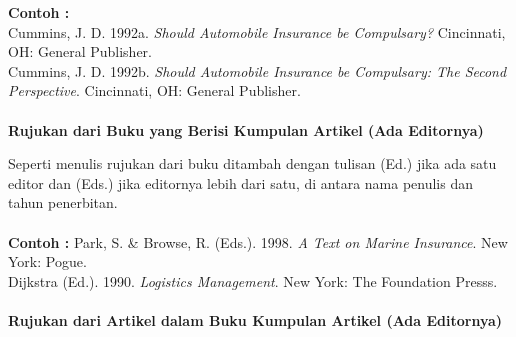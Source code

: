 \textbf{Contoh :} \\
Cummins,	J.	D.	1992a. \textit{Should	Automobile	Insurance	be	Compulsary?}	Cincinnati,	OH:	General	Publisher. \\
Cummins,	 J.	 D.	 1992b.	\textit{Should	 Automobile	 Insurance	 be	 Compulsary:	 The	 Second	Perspective}. Cincinnati,	OH:	General	Publisher.
\\
\\
\textbf{Rujukan dari Buku yang Berisi Kumpulan Artikel (Ada Editornya)}


Seperti	menulis	rujukan	dari	buku	ditambah	dengan	tulisan	(Ed.)	jika ada	satu	editor	dan	(Eds.)	jika	editornya	lebih	dari	satu,	di	antara	nama	penulis	dan	tahun	penerbitan. \\ \\

\textbf{Contoh :}
Park,	S.	\&	Browse,	R.	(Eds.).	1998. \textit{A	Text	on	Marine	Insurance}.	New	York:	Pogue. \\
Dijkstra	(Ed.).	1990. \textit{Logistics Management}. New	York:	The	Foundation	Presss.
\\
\\
\textbf{Rujukan dari Artikel dalam Buku Kumpulan Artikel (Ada Editornya)}


